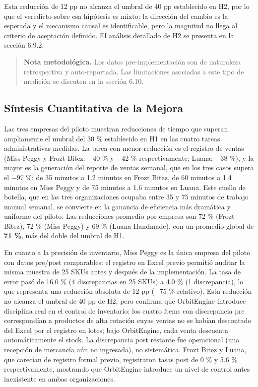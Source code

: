 Esta reducción de 12 pp no alcanza el umbral de 40 pp establecido en H2, por lo que el veredicto sobre esa hipótesis es mixto: la dirección del cambio es la esperada y el mecanismo causal es identificable, pero la magnitud no llega al criterio de aceptación definido. El análisis detallado de H2 se presenta en la sección 6.9.2.

\begin{quote}
\textbf{Nota metodológica.} Los datos pre-implementación son de naturaleza retrospectiva y auto-reportada. Las limitaciones asociadas a este tipo de medición se discuten en la sección 6.10.
\end{quote}

\subsection{Síntesis Cuantitativa de la Mejora}\label{suxedntesis-cuantitativa-de-la-mejora}

Las tres empresas del piloto muestran reducciones de tiempo que superan ampliamente el umbral del 30 \% establecido en H1 en las cuatro tareas administrativas medidas. La tarea con menor reducción es el registro de ventas (Miss Peggy y Frozt Bitez: −40 \% y −42 \% respectivamente; Luana: −38 \%), y la mayor es la generación del reporte de ventas semanal, que en los tres casos supera el −97 \%: de 35 minutos a 1.2 minutos en Frozt Bitez, de 60 minutos a 1.4 minutos en Miss Peggy y de 75 minutos a 1.6 minutos en Luana. Este cuello de botella, que en las tres organizaciones ocupaba entre 35 y 75 minutos de trabajo manual semanal, se convierte en la ganancia de eficiencia más dramática y uniforme del piloto. Las reducciones promedio por empresa son 72 \% (Frozt Bitez), 72 \% (Miss Peggy) y 69 \% (Luana Handmade), con un promedio global de \textbf{71 \%}, más del doble del umbral de H1.

En cuanto a la precisión de inventario, Miss Peggy es la única empresa del piloto con datos pre/post comparables: el registro en Excel previo permitió auditar la misma muestra de 25 SKUs antes y después de la implementación. La tasa de error pasó de 16.0 \% (4 discrepancias en 25 SKUs) a 4.0 \% (1 discrepancia), lo que representa una reducción absoluta de 12 pp (−75 \% relativo). Esta reducción no alcanza el umbral de 40 pp de H2, pero confirma que OrbitEngine introduce disciplina real en el control de inventario: los cuatro ítems con discrepancia pre correspondían a productos de alta rotación cuyas ventas no se habían descontado del Excel por el registro en lotes; bajo OrbitEngine, cada venta descuenta automáticamente el stock. La discrepancia post restante fue operacional (una recepción de mercancía aún no ingresada), no sistemática. Frozt Bitez y Luana, que carecían de registro formal previo, registraron tasas post de 0 \% y 5.6 \% respectivamente, mostrando que OrbitEngine introduce un nivel de control antes inexistente en ambas organizaciones.

